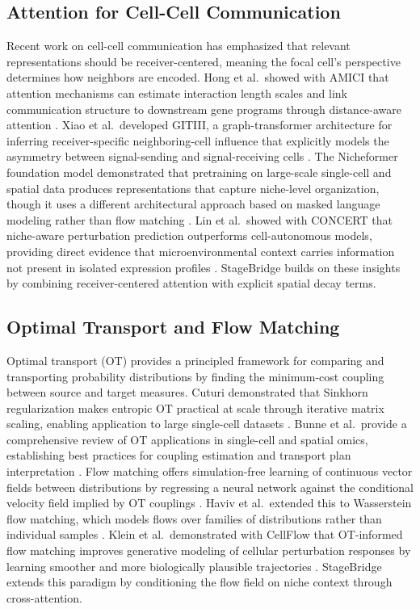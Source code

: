 \documentclass[conference]{IEEEtran}
\begin{document}
\subsection{Attention for Cell-Cell Communication}

Recent work on cell-cell communication has emphasized that relevant representations should be receiver-centered, meaning the focal cell's perspective determines how neighbors are encoded. Hong et al.\ showed with AMICI that attention mechanisms can estimate interaction length scales and link communication structure to downstream gene programs through distance-aware attention \cite{Hong2025-jm}. Xiao et al.\ developed GITIII, a graph-transformer architecture for inferring receiver-specific neighboring-cell influence that explicitly models the asymmetry between signal-sending and signal-receiving cells \cite{Xiao2025-fy}. The Nicheformer foundation model demonstrated that pretraining on large-scale single-cell and spatial data produces representations that capture niche-level organization, though it uses a different architectural approach based on masked language modeling rather than flow matching \cite{Tejada-Lapuerta2025-wz}. Lin et al.\ showed with CONCERT that niche-aware perturbation prediction outperforms cell-autonomous models, providing direct evidence that microenvironmental context carries information not present in isolated expression profiles \cite{Lin2025-mm}. StageBridge builds on these insights by combining receiver-centered attention with explicit spatial decay terms.

\subsection{Optimal Transport and Flow Matching}

Optimal transport (OT) provides a principled framework for comparing and transporting probability distributions by finding the minimum-cost coupling between source and target measures. Cuturi demonstrated that Sinkhorn regularization makes entropic OT practical at scale through iterative matrix scaling, enabling application to large single-cell datasets \cite{Cuturi2013-li}. Bunne et al.\ provide a comprehensive review of OT applications in single-cell and spatial omics, establishing best practices for coupling estimation and transport plan interpretation \cite{Bunne2024-pl}. Flow matching offers simulation-free learning of continuous vector fields between distributions by regressing a neural network against the conditional velocity field implied by OT couplings \cite{Lipman2022-ns}. Haviv et al.\ extended this to Wasserstein flow matching, which models flows over families of distributions rather than individual samples \cite{Haviv2024-qe}. Klein et al.\ demonstrated with CellFlow that OT-informed flow matching improves generative modeling of cellular perturbation responses by learning smoother and more biologically plausible trajectories \cite{Klein2025-sr}. StageBridge extends this paradigm by conditioning the flow field on niche context through cross-attention.
\end{document}
